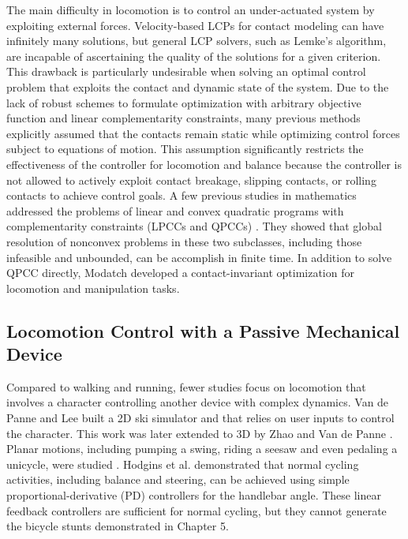 The main difficulty in
locomotion is to control an under-actuated system by exploiting
external forces. Velocity-based LCPs for contact
modeling can have infinitely many solutions, but general LCP solvers,
such as Lemke's algorithm, are incapable of ascertaining the quality of
the solutions for a given criterion. This drawback is particularly
undesirable when solving an optimal control problem that exploits the
contact and dynamic state of the system. Due to the lack of robust
schemes to formulate optimization with arbitrary objective function
and linear complementarity constraints, many previous methods
explicitly assumed that the contacts remain static
\cite{Abe:2007,Jain:2009,Kim:2011:DCO} while optimizing control forces
subject to equations of motion. This assumption significantly
restricts the effectiveness of the controller for locomotion and balance
because the controller is not allowed to actively exploit contact
breakage, slipping contacts, or rolling contacts to achieve control
goals. A few previous studies in mathematics addressed the problems of
linear and convex quadratic programs with complementarity constraints
(LPCCs and QPCCs) \cite{Hu:2008,Bai:2011}. They showed that global resolution of
nonconvex problems in these two subclasses, including those infeasible
and unbounded, can be accomplish in finite time. In addition to solve QPCC directly, Modatch \cite{} developed a contact-invariant optimization for locomotion and manipulation tasks.

\subsection{Locomotion Control with a Passive Mechanical Device} Compared to walking and running, fewer studies focus on locomotion that involves a character controlling another device with complex dynamics. Van de Panne and Lee \cite{vandepanne:2003} built a 2D ski simulator and that relies on user inputs to control the character. This work was later extended to 3D by Zhao and Van de Panne \cite{Zhao:2005}. Planar motions, including pumping a swing, riding a seesaw and even pedaling a unicycle, were studied \cite{Hodgins:1992}. Hodgins et al. \cite{Hodgins:1995:AHA} demonstrated that normal cycling activities, including balance and steering, can be achieved using simple proportional-derivative (PD) controllers for the handlebar angle. These linear feedback controllers are sufficient for normal cycling, but they cannot generate the bicycle stunts demonstrated in Chapter 5.

